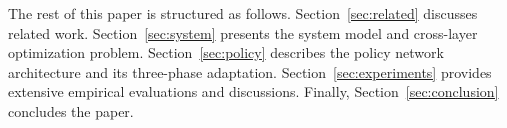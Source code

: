 The rest of this paper is structured as follows. Section~\ref{sec:related} discusses related work. Section~\ref{sec:system} presents the system model and cross-layer optimization problem. Section~\ref{sec:policy} describes the policy network architecture and its three-phase adaptation. Section~\ref{sec:experiments} provides extensive empirical evaluations and discussions. Finally, Section~\ref{sec:conclusion} concludes the paper.
